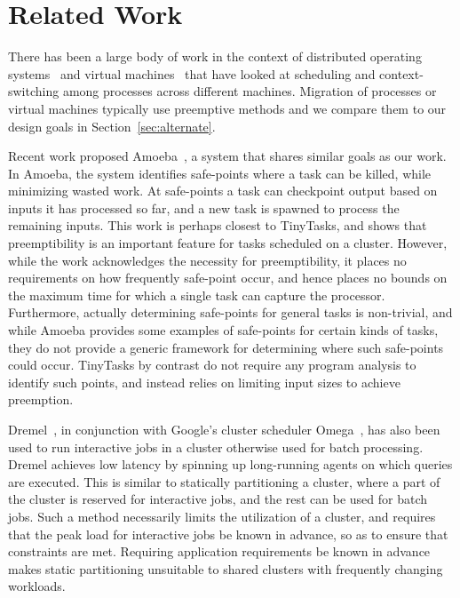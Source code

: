 \section{Related Work}

There has been a large body of work in the context of distributed operating 
systems~\cite{douglis1991transparent, milojivcic2000process,tanenbaum1990experiences, 
rozier1991overview} 
and virtual machines~\cite{tanenbaum1990experiences} that have looked at scheduling and
context-switching among processes across different machines. Migration of
processes or virtual machines typically use preemptive methods and we compare
them to our design goals in Section~\ref{sec:alternate}.

Recent work proposed Amoeba~\cite{ananthanarayanan2012true}, a system that
shares similar goals as our work. In Amoeba, the system identifies safe-points
where a task can be killed, while minimizing wasted work. At safe-points a task
can checkpoint output based on inputs it has processed so far, and a new task is
spawned to process the remaining inputs. This work is perhaps closest to
TinyTasks, and shows that preemptibility is an important feature for tasks
scheduled on a cluster.  However, while the work acknowledges the necessity for
preemptibility, it places no requirements on how frequently safe-point occur,
and hence places no bounds on the maximum time for which a single task can
capture the processor.  Furthermore, actually determining safe-points for
general tasks is non-trivial, and while Amoeba provides some examples of
safe-points for certain kinds of tasks, they do not provide a generic framework
for determining where such safe-points could occur.  TinyTasks by contrast do
not require any program analysis to identify such points, and instead relies on
limiting input sizes to achieve preemption.

Dremel~\cite{melnik2010dremel}, in conjunction with Google's cluster scheduler
Omega~\cite{wilkesberkeley}, has also been used to run interactive jobs in a
cluster otherwise used for batch processing. Dremel achieves low latency by
spinning up long-running agents on which queries are executed. This is similar
to statically partitioning a cluster, where a part of the cluster is reserved
for interactive jobs, and the rest can be used for batch jobs. Such a method
necessarily limits the utilization of a cluster, and requires that the peak load
for interactive jobs be known in advance, so as to ensure that constraints are
met. Requiring application requirements be known in advance makes static
partitioning unsuitable to shared clusters with frequently changing workloads.

